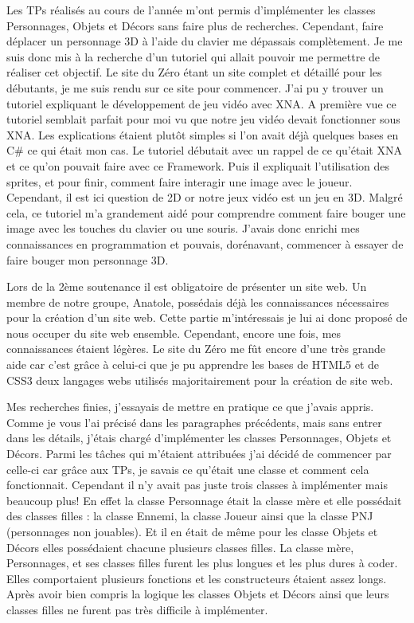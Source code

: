 \documentclass[12pt]{article}
\begin{document}
Les TPs réalisés au cours de l'année m'ont permis d'implémenter les classes Personnages, Objets et Décors sans faire plus de recherches. Cependant, faire déplacer un personnage 3D à l'aide du clavier me dépassais complètement. Je me suis donc mis à la recherche d'un tutoriel qui allait pouvoir me permettre de réaliser cet objectif. Le site du Zéro étant un site complet et détaillé pour les débutants, je me suis rendu sur ce site pour commencer. J'ai pu y trouver un tutoriel expliquant le développement de jeu vidéo avec XNA. A première vue ce tutoriel semblait parfait pour moi vu que notre jeu vidéo devait fonctionner sous XNA. Les explications étaient plutôt simples si l'on avait déjà quelques bases en C\# ce qui était mon cas. Le tutoriel débutait avec un rappel de ce qu'était XNA et ce qu'on pouvait faire avec ce Framework. Puis il expliquait l'utilisation des sprites, et pour finir, comment faire interagir une image avec le joueur. Cependant, il est ici question de 2D or notre jeux vidéo est un jeu en 3D. Malgré cela, ce tutoriel m'a grandement aidé pour comprendre comment faire bouger une image avec les touches du clavier ou une souris. J'avais donc enrichi mes connaissances en programmation et pouvais, dorénavant, commencer à essayer de faire bouger mon personnage 3D.

Lors de la 2ème soutenance il est obligatoire de présenter un site web. Un membre de notre groupe, Anatole, possédais déjà les connaissances nécessaires pour la création d'un site web. Cette partie m'intéressais je lui ai donc proposé de nous occuper du site web ensemble. Cependant, encore une fois, mes connaissances étaient légères. Le site du Zéro me fût encore d'une très grande aide car c'est grâce à celui-ci que je pu apprendre les bases de HTML5 et de CSS3 deux langages webs utilisés majoritairement pour la création de site web.

Mes recherches finies, j'essayais de mettre en pratique ce que j'avais appris. Comme je vous l'ai précisé dans les paragraphes précédents, mais sans entrer dans les détails, j'étais chargé d'implémenter les classes Personnages, Objets et Décors. Parmi les tâches qui m'étaient attribuées j'ai décidé de commencer par celle-ci car grâce aux TPs, je savais ce qu'était une classe et comment cela fonctionnait. Cependant il n'y avait pas juste trois classes à implémenter mais beaucoup plus! En effet la classe Personnage était la classe mère et elle possédait des classes filles : la classe Ennemi, la classe Joueur ainsi que la classe PNJ (personnages non jouables). Et il en était de même pour les classe Objets et Décors elles possédaient chacune plusieurs classes filles. La classe mère, Personnages, et ses classes filles furent les plus longues et les plus dures à coder. Elles comportaient plusieurs fonctions et les constructeurs étaient assez longs. Après avoir bien compris la logique les classes Objets et Décors ainsi que leurs classes filles ne furent pas très difficile à implémenter.
\end{document}
